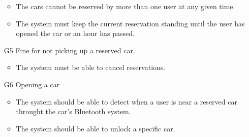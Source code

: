 \begin{itemize}
\begin{itemize}
			\item The cars cannot be reserved by more than one user at any given time.
			\item The system must keep the current reservation standing until the user has opened the car or an hour has passed.
		\end{itemize}
	\item [G5] Fine for not picking up a reserved car. %
		\begin{itemize}
			\item The system must be able to cancel reservations.
		\end{itemize}
	\item [G6] Opening a car %
		\begin{itemize}
			\item The system should be able to detect when a user is near a reserved car throught the car's Bluetooth system.
			\item The system should be able to unlock a specific car.
		\end{itemize}
	
	
	

\end{itemize}
